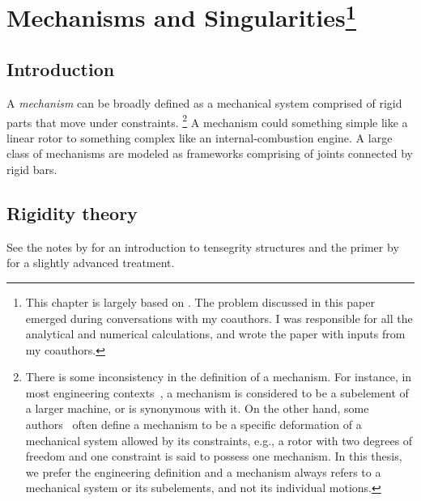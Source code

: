 
\chapter[Mechanisms and Singularities]{Mechanisms and Singularities\footnote{%
  This chapter is largely based on .
  The problem discussed in this paper emerged during conversations with my coauthors.
  I was responsible for all the analytical and numerical calculations, and wrote the paper with inputs from my coauthors.
}}


\section{Introduction}

A \emph{mechanism} can be broadly defined as a mechanical system comprised of rigid parts that move under constraints.%
\footnote{There is some inconsistency in the definition of a mechanism.
  For instance, in most engineering contexts~\cite{hartenberg1964,hunt1978,myszka2012}, a mechanism is considered to be a subelement of a larger machine, or is synonymous with it.
  On the other hand, some authors~\cite{connelly2015} often define a mechanism to be a specific deformation of a mechanical system allowed by its constraints, e.g., a rotor with two degrees of freedom and one constraint is said to possess one mechanism.
  In this thesis, we prefer the engineering definition and a mechanism always refers to a mechanical system or its subelements, and not its individual motions.}
A mechanism could something simple like a linear rotor to something complex like an internal-combustion engine.
A large class of mechanisms are modeled as frameworks comprising of joints connected by rigid bars.

\section{Rigidity theory}

See the notes by \citet{connelly2015} for an introduction to tensegrity structures and the primer by \citet{williams2003} for a slightly advanced treatment.

